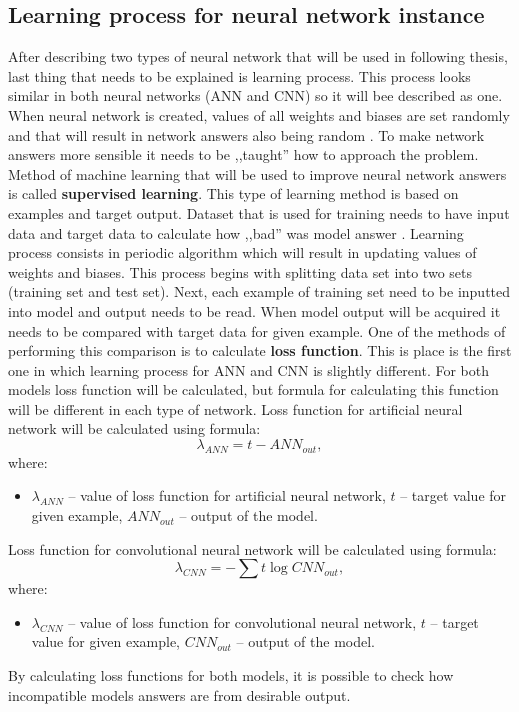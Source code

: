     \subsection{Learning process for neural network instance}\label{sec:learning-process-for-nn-instance}
    After describing two types of neural network that will be used in following thesis, last thing that needs to be explained is learning process. This process looks similar in both neural networks (ANN and CNN) so it will bee described as one. When neural network is created, values of all weights and biases are set randomly and that will result in network answers also being random \cite{bib:article-how-neural-network-learn}. To make network answers more sensible it needs to be ,,taught'' how to approach the problem. Method of machine learning that will be used to improve neural network answers is called \textbf{supervised learning}. This type of learning method is based on examples and target output. Dataset that is used for training needs to have input data and target data to calculate how ,,bad'' was model answer \cite{bib:book-statistical-learning}. Learning process consists in periodic algorithm which will result in updating values of weights and biases. This process begins with splitting data set into two sets (training set and test set). Next, each example of training set need to be inputted into model and output needs to be read. When model output will be acquired it needs to be compared with target data for given example. One of the methods of performing this comparison is to calculate \textbf{loss function}. This is place is the first one in which learning process for ANN and CNN is slightly different. For both models loss function will be calculated, but formula for calculating this function will be different in each type of network. Loss function for artificial neural network will be calculated using formula:
    \begin{equation}
        \lambda_{ANN} = t - ANN_{out},
    \end{equation}
    where:
    \begin{itemize}[label=]
        \item $\lambda_{ANN}$ -- value of loss function for artificial neural network, $t$ -- target value for given example, $ANN_{out}$ -- output of the model.
    \end{itemize}
    Loss function for convolutional neural network will be calculated using formula:
    \begin{equation}
        \lambda_{CNN} = -\sum t \log CNN_{out},
    \end{equation}
    where:
    \begin{itemize}[label=]
        \item $\lambda_{CNN}$ -- value of loss function for convolutional neural network, $t$ -- target value for given example, $CNN_{out}$ -- output of the model.
    \end{itemize}
    By calculating loss functions for both models, it is possible to check how incompatible models answers are from desirable output. 

